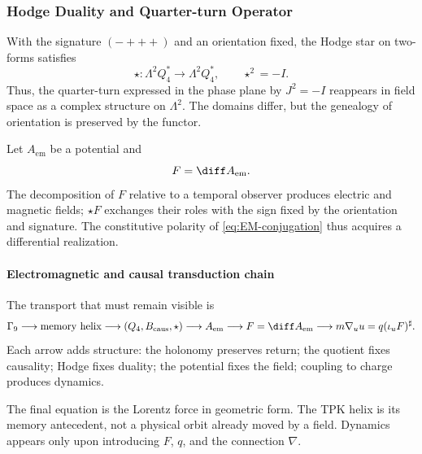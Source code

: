 \subsubsection{Hodge Duality and Quarter-turn Operator}

With the signature \((-+++ )\) and an orientation fixed, the Hodge star on
two-forms satisfies
\begin{equation}
\star:\Lambda^2Q_4^*\to\Lambda^2Q_4^*,
\qquad \star^2=-I.
\label{eq:hodge-star}
\end{equation}
Thus, the quarter-turn expressed in the phase plane by
\(J^2=-I\) reappears in field space as a complex structure on
\(\Lambda^2\). The domains differ, but the genealogy of orientation
is preserved by the functor.

Let \(A_{\mathrm{em}}\) be a potential and
\begin{equation}
F=\diff A_{\mathrm{em}}.
\label{eq:F-dA}
\end{equation}
The decomposition of \(F\) relative to a temporal observer produces electric
and magnetic fields; \(\star F\) exchanges their roles with the sign fixed
by the orientation and signature. The constitutive polarity of
\eqref{eq:EM-conjugation} thus acquires a differential realization.

\paragraph{Electromagnetic and causal transduction chain}

The transport that must remain visible is
\begin{equation}
\Gamma_9
\longrightarrow\text{memory helix}
\longrightarrow(Q_4,B_{\mathrm{caus}},\star)
\longrightarrow A_{\mathrm{em}}
\longrightarrow F=\diff A_{\mathrm{em}}
\longrightarrow
m\nabla_u u=q(\iota_uF)^\sharp.
\label{eq:lorentz-chain}
\end{equation}
Each arrow adds structure: the holonomy preserves return; the quotient fixes
causality; Hodge fixes duality; the potential fixes the field; coupling
to charge produces dynamics.

The final equation is the Lorentz force in geometric form. The TPK helix
is its memory antecedent, not a physical orbit already moved by a field.
Dynamics appears only upon introducing \(F\), \(q\), and the connection \(\nabla\).

